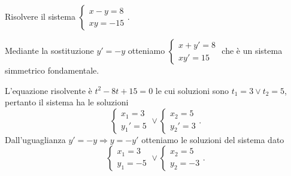 \begin{esempio}{}{}
Risolvere il sistema 
\(\left\{\begin{array}{l}{x-y=8}\\{{xy}=-15}\end{array}\right.\).

Mediante la sostituzione \(y'=-y\) otteniamo 
\(\left\{\begin{array}{l}{x+y'=8}\\{xy'=15}\end{array}\right.\) che è un sistema 
simmetrico fondamentale.

L'equazione risolvente è \(t^2-8t+15=0\) le cui soluzioni sono \(t_1=3\vee 
t_2=5\), pertanto il sistema ha le soluzioni 
\[\left\{\begin{array}{l}{x_1=3}\\
{{y_1}'=5}\end{array}\right.\vee 
\left\{\begin{array}{l}{x_2=5}\\
{{y_2}'=3}\end{array}\right..\] 
Dall'uguaglianza \(y'=-y\Rightarrow y=-y'\) otteniamo le soluzioni del sistema 
dato 
\[\left\{\begin{array}{l}{x_1=3}\\
{y_1=-5}\end{array}\right.\vee 
\left\{\begin{array}{l}{x_2=5}\\
{y_2=-3}\end{array}\right..\]
\end{esempio}

